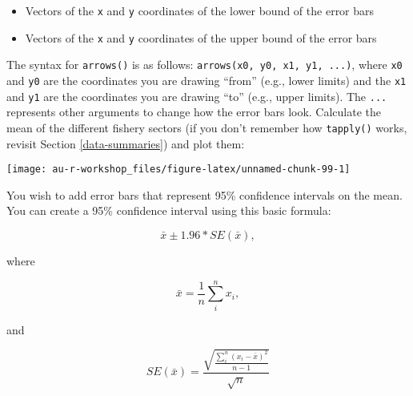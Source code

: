 \documentclass[]{book}
\newenvironment{Shaded}{\begin{snugshade}}{\end{snugshade}}
\newcommand{\KeywordTok}[1]{\textcolor[rgb]{0.13,0.29,0.53}{\textbf{#1}}}
\newcommand{\StringTok}[1]{\textcolor[rgb]{0.31,0.60,0.02}{#1}}
\newcommand{\OperatorTok}[1]{\textcolor[rgb]{0.81,0.36,0.00}{\textbf{#1}}}
\newcommand{\NormalTok}[1]{#1}
\providecommand{\tightlist}{%
  \setlength{\itemsep}{0pt}\setlength{\parskip}{0pt}}
\theoremstyle{definition}
\theoremstyle{definition}
\theoremstyle{definition}
\theoremstyle{remark}
\begin{document}
\begin{itemize}
\tightlist
\item
  Vectors of the \texttt{x} and \texttt{y} coordinates of the lower
  bound of the error bars
\item
  Vectors of the \texttt{x} and \texttt{y} coordinates of the upper
  bound of the error bars
\end{itemize}

The syntax for \texttt{arrows()} is as follows:
\texttt{arrows(x0,\ y0,\ x1,\ y1,\ ...)}, where \texttt{x0} and
\texttt{y0} are the coordinates you are drawing ``from'' (e.g., lower
limits) and the \texttt{x1} and \texttt{y1} are the coordinates you are
drawing ``to'' (e.g., upper limits). The \texttt{...} represents other
arguments to change how the error bars look. Calculate the mean of the
different fishery sectors (if you don't remember how \texttt{tapply()}
works, revisit Section \ref{data-summaries}) and plot them:

\begin{Shaded}
\end{Shaded}

\begin{center}\texttt{[image: au-r-workshop\_files/figure-latex/unnamed-chunk-99-1]} \end{center}

You wish to add error bars that represent 95\% confidence intervals on
the mean. You can create a 95\% confidence interval using this basic
formula:

\begin{equation}
  \bar{x} \pm 1.96 * SE(\bar{x}),
\label{eq:ci}
\end{equation}

where

\begin{equation}
  \bar{x}=\frac{1}{n}\sum_i^n{x_i},
\label{eq:ci-mean}
\end{equation}

and

\begin{equation}
  SE(\bar{x})=\frac{\sqrt{\frac{\sum_i^n{(x_i - \bar{x})^2}}{n-1}}}{\sqrt{n}}
\label{eq:ci-se}
\end{equation}
\end{document}
